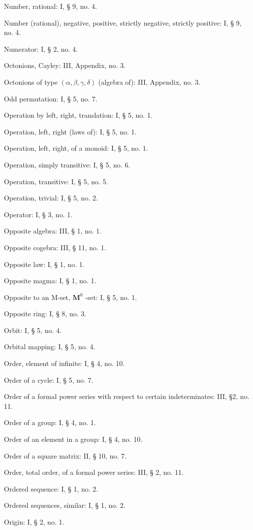 Number, rational: I, § 9, no. 4.

Number (rational), negative, positive, strictly negative, strictly positive: I, § 9, no. 4.

Numerator: I, § 2, no. 4.

Octonions, Cayley: III, Appendix, no. 3.

Octonions of type \((\alpha, \beta, \gamma, \delta)\) (algebra of): III, Appendix, no. 3.

Odd permutation: I, § 5, no. 7.

Operation by left, right, translation: I, § 5, no. 1.

Operation, left, right (laws of): I, § 5, no. 1.

Operation, left, right, of a monoid: I, § 5, no. 1.

Operation, simply transitive: I, § 5, no. 6.

Operation, transitive: I, § 5, no. 5.

Operation, trivial: I, § 5, no. 2.

Operator: I, § 3, no. 1.

Opposite algebra: III, § 1, no. 1.

Opposite cogebra: III, § 11, no. 1.

Opposite law: I, § 1, no. 1.

Opposite magma: I, § 1, no. 1.

Opposite to an M-set, \(\mathbf{M}^0\) -set: I, § 5, no. 1.

Opposite ring: I, § 8, no. 3.

Orbit: I, § 5, no. 4.

Orbital mapping: I, § 5, no. 4.

Order, element of infinite: I, § 4, no. 10.

Order of a cycle: I, § 5, no. 7.

Order of a formal power series with respect to certain indeterminates: III, §2, no. 11.

Order of a group: I, § 4, no. 1.

Order of an element in a group: I, § 4, no. 10.

Order of a square matrix: II, § 10, no. 7.

Order, total order, of a formal power series: III, § 2, no. 11.

Ordered sequence: I, § 1, no. 2.

Ordered sequences, similar: I, § 1, no. 2.

Origin: I, § 2, no. 1.

